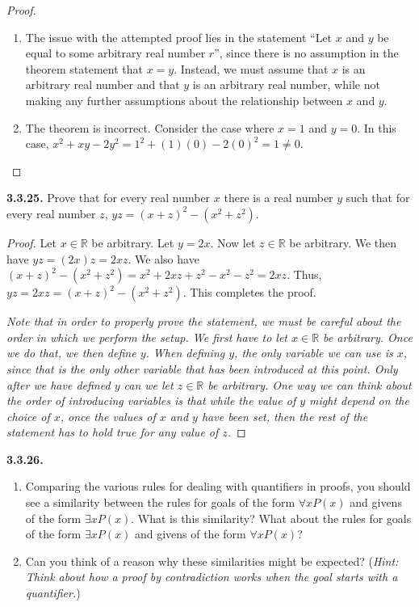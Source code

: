 \documentclass[12pt]{amsart}
\newenvironment{statement}[1]{\smallskip\noindent\color[rgb]{.6627, .3529, .6314} {\bf #1.}}{}
\theoremstyle{definition}
\theoremstyle{remark}
\newcommand{\BR}{\mathbb R}
\begin{document}
\begin{proof}
\hfill
\begin{enumerate}
	\item The issue with the attempted proof lies in the statement
	``Let $x$ and $y$ be equal to some arbitrary real number $r$'',
	since there is no assumption in the theorem statement that $x = y$.
	Instead, we must assume that $x$ is an arbitrary real number and that $y$ is an arbitrary real
	number, while not making any further assumptions about the relationship between $x$ and $y$.
	
	\item The theorem is incorrect.
	Consider the case where $x = 1$ and $y = 0$.
	In this case, $x^2 + xy - 2y^2 = 1^2 + (1)(0) - 2(0)^2 = 1 \neq 0$.
\end{enumerate}
\end{proof}


\begin{statement}{3.3.25}
Prove that for every real number $x$ there is a real number $y$ such that for every real number $z$, $yz = (x + z)^2 - (x^2 + z^2)$.
\end{statement}

\begin{proof}
Let $x \in \BR$ be arbitrary.
Let $y = 2x$.
Now let $z \in \BR$ be arbitrary.
We then have $yz = (2x)z = 2xz$.
We also have $(x + z)^2 - (x^2 + z^2) = x^2 + 2xz + z^2 - x^2 - z^2 = 2xz$.
Thus, $yz = 2xz = (x + z)^2 - (x^2 + z^2)$.
This completes the proof.

\emph{
Note that in order to properly prove the statement, we must be careful about the order in which we perform the setup.
We first have to let $x \in \BR$ be arbitrary.
Once we do that, we then define $y$.
When defining $y$, the only variable we can use is $x$, since that is the only other variable that has been introduced at this point.
Only after we have defined $y$ can we let $z \in \BR$ be arbitrary.
One way we can think about the order of introducing variables is that while the value of $y$ might depend on the choice of $x$, once the values of $x$ and $y$ have been set, then the rest of the statement has to hold true for any value of $z$.
}
\end{proof}


\begin{statement}{3.3.26}
\begin{enumerate}
	\item Comparing the various rules for dealing with quantifiers in proofs,
	you should see a similarity between the rules for goals of the form $\forall x P(x)$
	and givens of the form $\exists x P(x)$.
	What is this similarity?
	What about the rules for goals of the form $\exists x P(x)$ and givens of the form $\forall x P(x)$?
	
	\item Can you think of a reason why these similarities might be expected?
	(\emph{Hint: Think about how a proof by contradiction works when
	the goal starts with a quantifier.})
\end{enumerate}
\end{statement}
\end{document}
